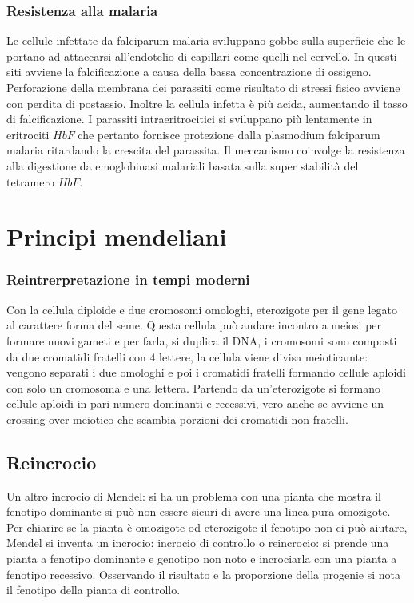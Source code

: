 \subsubsection{Resistenza alla malaria}
Le cellule infettate da falciparum malaria sviluppano gobbe sulla superficie che le portano ad attaccarsi all'endotelio di capillari come quelli nel cervello. In questi siti avviene
la falcificazione a causa della bassa concentrazione di ossigeno. Perforazione della membrana dei parassiti come risultato di stressi fisico avviene con perdita di postassio. Inoltre
la cellula infetta \`e pi\`u acida, aumentando il tasso di falcificazione. I parassiti intraeritrocitici si sviluppano pi\`u lentamente in eritrociti $HbF$ che pertanto fornisce
protezione dalla plasmodium falciparum malaria ritardando la crescita del parassita. Il meccanismo coinvolge la resistenza alla digestione da emoglobinasi malariali basata sulla 
super stabilit\`a del tetramero $HbF$. 





\section{Principi mendeliani}
\subsubsection{Reintrerpretazione in tempi moderni}
Con la cellula diploide e due cromosomi omologhi, eterozigote per il gene legato al carattere forma del seme. Questa cellula pu\`o andare incontro a meiosi per formare nuovi gameti e 
per farla, si duplica il DNA, i cromosomi sono composti da due cromatidi fratelli con $4$ lettere, la cellula viene divisa meioticamte: vengono separati i due omologhi e poi i cromatidi
fratelli formando cellule aploidi con solo un cromosoma e una lettera. Partendo da un'eterozigote si formano cellule aploidi in pari numero dominanti e recessivi, vero anche se avviene
un crossing-over meiotico che scambia porzioni dei cromatidi non fratelli. 
\subsection{Reincrocio}
Un altro incrocio di Mendel: si ha un problema con una pianta che mostra il fenotipo dominante si pu\`o non essere sicuri di avere una linea pura omozigote. Per chiarire se la pianta
\`e omozigote od eterozigote il fenotipo non ci pu\`o aiutare, Mendel si inventa un incrocio: incrocio di controllo o reincrocio: si prende una pianta a fenotipo dominante e genotipo 
non noto e incrociarla con una pianta a fenotipo recessivo. Osservando il risultato e la proporzione della progenie si nota il fenotipo della pianta di controllo. 
